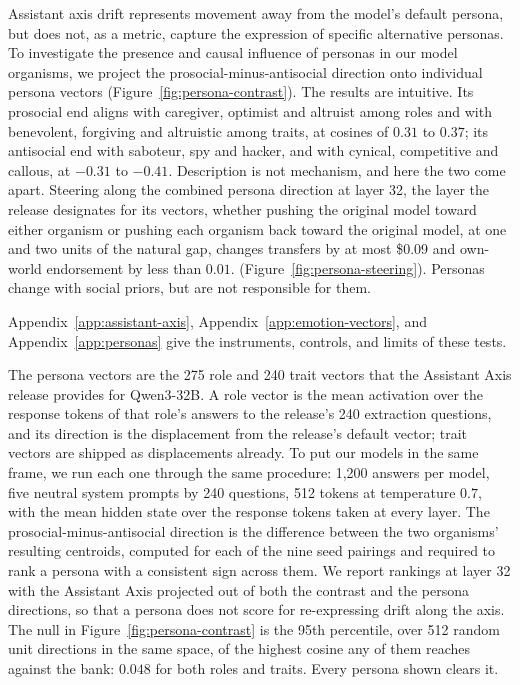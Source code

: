 \documentclass{article} %
\begin{document}
Assistant axis drift represents movement away from the model's default persona, but does not, as a metric, capture the expression of specific alternative personas. To investigate the presence and causal influence of personas in our model organisms, we project the
prosocial-minus-antisocial direction onto individual persona vectors
\citep{lu2026assistant} (Figure~\ref{fig:persona-contrast}). The results are intuitive. Its prosocial end aligns with caregiver, optimist and
altruist among roles and with benevolent, forgiving and altruistic among traits,
at cosines of $0.31$ to $0.37$; its antisocial end with saboteur, spy and hacker,
and with cynical, competitive and callous, at $-0.31$ to $-0.41$. Description is
not mechanism, and here the two come apart. Steering along the combined persona direction at layer 32, the layer the release
designates for its vectors, whether pushing the original model toward either
organism or pushing each organism back toward the original model, at one and two
units of the natural gap, changes transfers by at most \$0.09 and own-world
endorsement by less than $0.01$. (Figure~\ref{fig:persona-steering}). Personas change with social priors, but are not responsible for them.






Appendix~\ref{app:assistant-axis}, Appendix~\ref{app:emotion-vectors}, and Appendix~\ref{app:personas} give the instruments, controls, and limits of these tests.


The persona vectors are the 275 role and 240 trait vectors that the Assistant Axis
release \citep{lu2026assistant} provides for Qwen3-32B. A role vector is the mean
activation over the response tokens of that role's answers to the release's 240
extraction questions, and its direction is the displacement from the release's
default vector; trait vectors are shipped as displacements already. To put our
models in the same frame, we run each one through the same procedure: 1{,}200
answers per model, five neutral system prompts by 240 questions, 512 tokens at
temperature $0.7$, with the mean hidden state over the response tokens taken at
every layer. The prosocial-minus-antisocial direction is the difference between
the two organisms' resulting centroids, computed for each of the nine seed
pairings and required to rank a persona with a consistent sign across them. We
report rankings at layer 32 with the Assistant Axis projected out of both the
contrast and the persona directions, so that a persona does not score for
re-expressing drift along the axis. The null in Figure~\ref{fig:persona-contrast}
is the 95th percentile, over 512 random unit directions in the same space, of the
highest cosine any of them reaches against the bank: $0.048$ for both roles and
traits. Every persona shown clears it.
\end{document}
